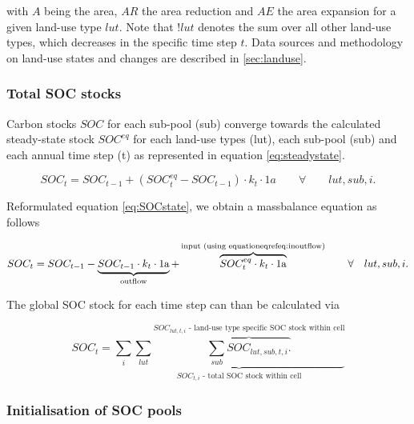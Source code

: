 \documentclass[gc, manuscript]{copernicus}
\begin{document}
with \(A\) being the area, \(AR\) the area reduction and \(AE\) the area expansion for a given land-use type \(lut\). Note that \(!lut\) denotes the sum over all other land-use types, which decreases in the specific time step \(t\). Data sources and methodology on land-use states and changes are described in \ref{sec:landuse}.

\hypertarget{total-soc-stocks}{%
\subsubsection{Total SOC stocks}\label{total-soc-stocks}}

Carbon stocks \(SOC\) for each sub-pool (sub) converge towards the calculated steady-state stock \(SOC^{eq}\) for each land-use types (lut), each sub-pool (sub) and each annual time step (t) as represented in equation \eqref{eq:steadystate}.

\begin{equation}
SOC_{t} = SOC_{t-1} + (SOC^{eq}_{t} - SOC_{t-1}) \cdot k_{t} \cdot 1\unit{a} \qquad \forall\quad\quad lut, sub, i.
\label{eq:SOCstate}
\end{equation}

Reformulated equation \eqref{eq:SOCstate}, we obtain a massbalance equation as follows

\begin{equation}
SOC_{t} = SOC_{t-1} - \underbrace{SOC_{t-1} \cdot k_{t} \cdot 1\unit{a}}_{\text{outflow}} + \overbrace{SOC^{eq}_{t} \cdot k_{t} \cdot 1\unit{a}}^{\text{input (using equation \\eqref{eq:inoutflow})}}  \qquad \forall\quad lut, sub, i.
\label{eq:steadystate2budget}
\end{equation}

The global SOC stock for each time step can than be calculated via

\begin{equation}
SOC_{t} = \sum_{i} \underbrace{\sum_{lut} \overbrace{\sum_{sub} SOC_{lut, sub, t, i}.}^{\text{$SOC_{lut, t, i}$ - land-use type specific SOC stock within cell}}}_{\text{$SOC_{t, i}$ - total SOC stock within cell}}
\label{eq:totalstock}
\end{equation}

\hypertarget{initialisation-of-soc-pools}{%
\subsubsection{Initialisation of SOC pools}\label{initialisation-of-soc-pools}}
\end{document}
